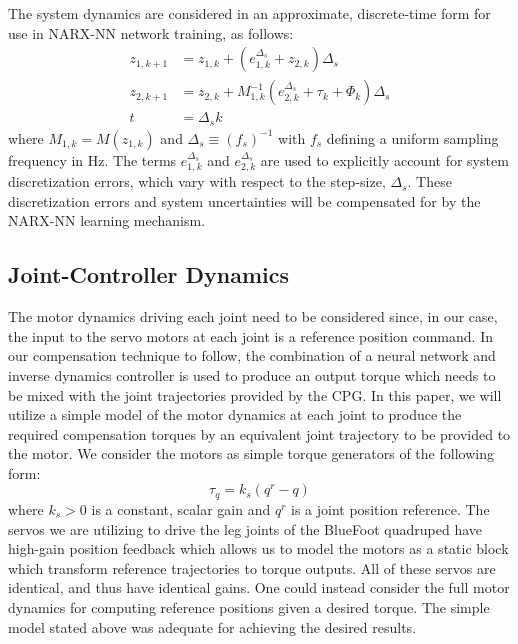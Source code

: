 The system dynamics are considered in an approximate, discrete-time form for use in NARX-NN network 
training, as follows:
	\begin{equation}
		\begin{split}
		{z}_{1,k+1} &= {z}_{1,k} + ( {e}_{1,k}^{\Delta_{s}} + {z}_{2,k} )\Delta_{s} \\
		{z}_{2,k+1} &= {z}_{2,k} + M^{-1}_{1,k}( {e}_{2,k}^{\Delta_{s}} + \tau_{k} + \Phi_{k}) \Delta_{s} \\
		t 			&= \Delta_{s} k
		\end{split}
		\label{eq::sampled_dynamics}
	\end{equation}
where $M_{1,k} = M(z_{1,k})$ and $\Delta_{s} \equiv (f_{s})^{-1}$ with $f_{s}$ defining a uniform 
sampling frequency in Hz. The terms ${e}_{1,k}^{\Delta_{s}}$ and ${e}_{2,k}^{\Delta_{s}}$ are used to explicitly 
account for system discretization errors, which vary with respect to the step-size, $\Delta_{s}$. These
discretization errors and system uncertainties will be compensated for by the NARX-NN learning mechanism.


\subsection{Joint-Controller Dynamics}
%
%
The motor dynamics driving each joint need to be considered since, in our case, the input to the
servo motors at each joint is a reference position command. In our compensation technique to follow,
the combination of a neural network and inverse dynamics controller is used to produce an output
torque which needs to be mixed  with the joint trajectories provided by the CPG. In this paper,
we will utilize a simple model of the motor dynamics at each joint to produce the required compensation
torques by an equivalent joint trajectory to be provided to the motor. We consider the motors as simple
torque generators of the following form:
	\begin{equation}
		\tau_{q} = k_{s}(q^{r}-q)
		\label{eq::servo_control_dynamics}
	\end{equation}
where $k_{s}>0$ is a constant, scalar gain and $q^{r}$ is a joint position reference. The servos we are utilizing to drive the leg joints of
the BlueFoot quadruped have high-gain position feedback which allows us to model the motors as a static block which transform reference trajectories to torque outputs. All of these servos are identical, and thus have identical gains. One could instead consider the full motor dynamics for computing reference positions given a desired torque. The simple model stated above was
adequate for achieving the desired results.